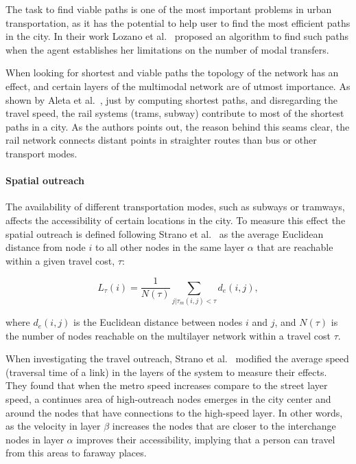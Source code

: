 The task to find viable paths is one of the most important problems in urban transportation, as it has the potential to help user to find the most efficient paths in the city. In their work Lozano et al.~\cite{lozano2001path} proposed an algorithm to find such paths when the agent establishes her limitations on the number of modal transfers.

When looking for shortest and viable paths the topology of the network has an effect, and certain layers of the multimodal network are of utmost importance. As shown by Aleta et al.~\cite{aleta2017transportation}, just by computing shortest paths, and disregarding the travel speed, the rail systems (trams, subway) contribute to most of the shortest paths in a city. As the authors points out, the reason behind this seams clear, the rail network connects distant points in straighter routes than bus or other transport modes. 

\paragraph*{Spatial outreach}
The availability of different transportation modes, such as subways or tramways, affects the accessibility of certain locations in the city. To measure this effect the spatial outreach is defined following Strano et al.~\cite{strano2015features} as the average Euclidean distance from node $i$ to all other nodes in the same layer $\alpha$ that are reachable within a given travel cost, $\tau$:

\begin{equation}
    L_\tau(i)=\frac{1}{N(\tau)}\sum_{j|\tau_{m}(i,j)<\tau}d_e(i,j),
    \label{eq:outreach}
\end{equation}

where $d_e(i,j)$ is the Euclidean distance between nodes $i$ and $j$, and $N(\tau)$ is the number of nodes reachable on the multilayer network within a travel cost $\tau$.

When investigating the travel outreach, Strano et al.~\cite{strano2015features} modified the average speed (traversal time of a link) in the layers of the system to measure their effects. They found that when the metro speed increases compare to the street layer speed, a continues area of high-outreach nodes emerges in the city center and around the nodes that have connections to the high-speed layer. In other words, as the velocity in layer $\beta$ increases the nodes that are closer to the interchange nodes in layer $\alpha$ improves their accessibility, implying that a person can travel from this areas to faraway places. 

